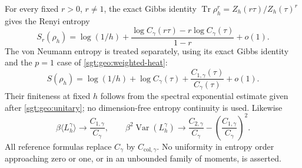 \documentclass[aps,pra,reprint,superscriptaddress,longbibliography]{revtex4-2}
\newcommand{\Tr}{\operatorname{Tr}}
\begin{document}
For every fixed $r>0$, $r\ne1$, the exact Gibbs identity
$\Tr\rho_h^r=Z_h(r\tau)/Z_h(\tau)^r$ gives the Renyi entropy
\begin{equation}
 S_r(\rho_h)=\log(1/h)+
 \frac{\log C_\gamma(r\tau)-r\log C_\gamma(\tau)}{1-r}+o(1).
 \label{sgt:geo:renyi}
\end{equation}
The von Neumann entropy is treated separately, using its exact Gibbs
identity and the $p=1$ case of \eqref{sgt:geo:weighted-heat}:
\begin{equation}
 S(\rho_h)=\log(1/h)+\log C_\gamma(\tau)
                 +\frac{C_{1,\gamma}(\tau)}{C_\gamma(\tau)}+o(1).
 \label{sgt:geo:entropy}
\end{equation}
Their finiteness at fixed $h$ follows from the spectral exponential
estimate given after \eqref{sgt:geo:unitary}; no dimension-free entropy
continuity is used.  Likewise
\begin{equation}
 \beta\langle L_h^\gamma\rangle\longrightarrow
       \frac{C_{1,\gamma}}{C_\gamma},\qquad
 \beta^2\operatorname{Var}(L_h^\gamma)\longrightarrow
       \frac{C_{2,\gamma}}{C_\gamma}
          -\left(\frac{C_{1,\gamma}}{C_\gamma}\right)^2.
 \label{sgt:geo:energy}
\end{equation}
All reference formulas replace $C_\gamma$ by $C_{\mathrm{col},\gamma}$.
No uniformity in entropy order approaching zero or one, or in an
unbounded family of moments, is asserted.
\end{document}
